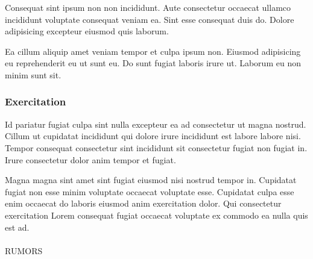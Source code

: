 \documentclass[
  10pt,
  titlepage=firstiscover,
  toc=flat,
  twoside]{scrreprt}
\makeatletter
\let\oldparagraph\paragraph
\renewcommand{\paragraph}{
    \@ifstar
      \xxxParagraphStar
      \xxxParagraphNoStar
  }
\newcommand{\xxxParagraphStar}[1]{\oldparagraph*{#1}\mbox{}}
\newcommand{\xxxParagraphNoStar}[1]{\oldparagraph{#1}\mbox{}}
\makeatother
\begin{document}
\vspace*{4pt}\begin{figure}\centering{}\end{figure}

Consequat sint ipsum non non incididunt. Aute consectetur occaecat
ullamco incididunt voluptate consequat veniam ea. Sint esse consequat
duis do. Dolore adipisicing excepteur eiusmod quis laborum.

Ea cillum aliquip amet veniam tempor et culpa ipsum non. Eiusmod
adipisicing eu reprehenderit eu ut sunt eu. Do sunt fugiat laboris irure
ut. Laborum eu non minim sunt sit.

\subsubsection{Exercitation}\label{exercitation}

Id pariatur fugiat culpa sint nulla excepteur ea ad consectetur ut magna
nostrud. Cillum ut cupidatat incididunt qui dolore irure incididunt est
labore labore nisi. Tempor consequat consectetur sint incididunt sit
consectetur fugiat non fugiat in. Irure consectetur dolor anim tempor et
fugiat.

Magna magna sint amet sint fugiat eiusmod nisi nostrud tempor in.
Cupidatat fugiat non esse minim voluptate occaecat voluptate esse.
Cupidatat culpa esse enim occaecat do laboris eiusmod anim exercitation
dolor. Qui consectetur exercitation Lorem consequat fugiat occaecat
voluptate ex commodo ea nulla quis est ad.

\paragraph{RUMORS}\label{rumors}
\end{document}
